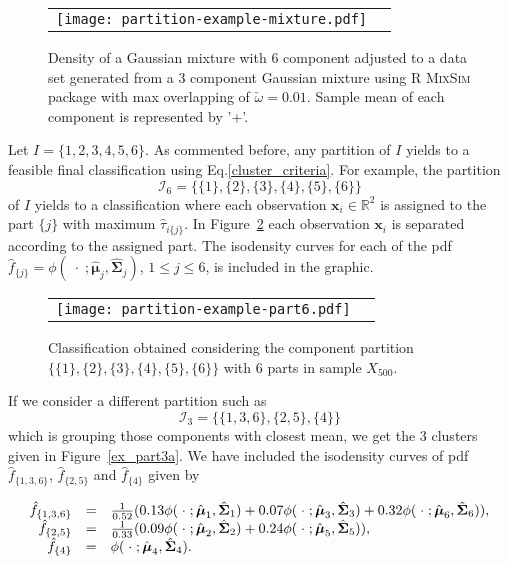 \documentclass[10pt, a4paper]{article}
\newcommand{\m}[1]{\boldsymbol{#1}}
\begin{document}
\begin{figure}[thbp]
\begin{center}
\begin{tabular}{cc}
  \texttt{[image: partition-example-mixture.pdf]} \\
 \end{tabular}
 \caption{Density of a Gaussian mixture with 6 component adjusted to a data set generated from a 3 component Gaussian mixture using R \textsc{MixSim} package with max overlapping of $\check{\omega} = 0.01$. Sample mean of each component is represented by '+'.}\label{ex_mixture}
\end{center}
\end{figure}

Let $I = \{1,2,3,4,5,6\}$. As commented before, any partition of $I$ yields to a feasible final classification using Eq.\ref{cluster_criteria}. For example, the partition
\[
\mathcal{I}_6 = \{\{1\},\{2\},\{3\},\{4\},\{5\},\{6\}\}
\]
of $I$ yields to a classification where each observation $\m x_i \in \mathbb{R}^2$ is  assigned to the part $\{j\}$ with maximum $\hat{\tau}_{i\{j\}}$. In Figure~\ref{ex_part6} each observation $\m x_i$ is separated according to the assigned part. The isodensity curves for each of the pdf $\hat{f}_{\{j\}} = \phi(\;\cdot\; ; \hat{\m\mu}_j, \hat{\m\Sigma}_j)$, $1\leq j \leq 6$, is included in the graphic.

\begin{figure}[!h]
\begin{center}
\begin{tabular}{cc}
  \texttt{[image: partition-example-part6.pdf]} \\
 \end{tabular}
 \caption{Classification obtained considering the component partition $\{ \{1\}, \{2\}, \{3\}, \{4\}, \{5\}, \{6\} \}$ with 6 parts in sample $X_{500}$.}\label{ex_part6}
\end{center}
\end{figure}

If we consider a different partition such as
\[\mathcal{I}_3 = \{\{1, 3, 6\},\{2, 5\},\{4\}\}\]
which is grouping those components with closest mean, we get the 3 clusters given in Figure~\ref{ex_part3a}. We have included the isodensity curves of pdf $\hat{f}_{\{1,3,6\}}$, $\hat{f}_{\{2, 5\}}$ and $\hat{f}_{\{4\}}$ given by

\[
\begin{array}{r c l}
\hat{f}_{\{1,3,6\}} & = & \frac{1}{0.52}(0.13 \phi(\;\cdot\; ; \hat{\m\mu}_1, \hat{\m\Sigma}_1) + 0.07 \phi(\;\cdot\; ; \hat{\m\mu}_3, \hat{\m\Sigma}_3) + 0.32 \phi(\;\cdot\; ; \hat{\m\mu}_6, \hat{\m\Sigma}_6)), \\
\hat{f}_{\{2, 5\}} & = &  \frac{1}{0.33}(0.09 \phi(\;\cdot\; ; \hat{\m\mu}_2, \hat{\m\Sigma}_2) + 0.24 \phi(\;\cdot\; ; \hat{\m\mu}_5, \hat{\m\Sigma}_5)), \\
\hat{f}_{\{4\}} & = &\phi(\;\cdot\; ; \hat{\m\mu}_4, \hat{\m\Sigma}_4).
\end{array}
\]
\end{document}
